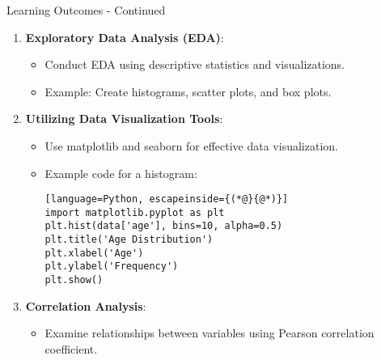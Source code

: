 \documentclass[aspectratio=169]{beamer}
\begin{document}
\begin{frame}[fragile]{Learning Outcomes - Continued}
    \begin{enumerate}[resume]
        \item \textbf{Exploratory Data Analysis (EDA)}:
            \begin{itemize}
                \item Conduct EDA using descriptive statistics and visualizations.
                \item Example: Create histograms, scatter plots, and box plots.
            \end{itemize}
        
        \item \textbf{Utilizing Data Visualization Tools}:
            \begin{itemize}
                \item Use matplotlib and seaborn for effective data visualization.
                \item Example code for a histogram:
                \begin{lstlisting}[language=Python, escapeinside={(*@}{@*)}]
import matplotlib.pyplot as plt
plt.hist(data['age'], bins=10, alpha=0.5)
plt.title('Age Distribution')
plt.xlabel('Age')
plt.ylabel('Frequency')
plt.show()
                \end{lstlisting}
            \end{itemize}

        \item \textbf{Correlation Analysis}:
            \begin{itemize}
                \item Examine relationships between variables using Pearson correlation coefficient.
            \end{itemize}
    \end{enumerate}
\end{frame}
\end{document}
